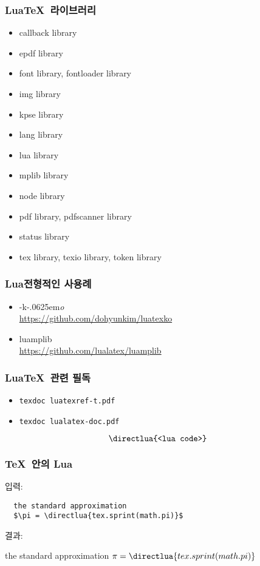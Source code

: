 \documentclass{beamer}
\def\luatex{\hologo{LuaTeX}}
\def\logoko{\textsf{k}\kern-.0625em\textit{o}}
\def\luatexko{\luatex-\logoko}
\begin{document}
\begin{frame}
  \frametitle{Lua\TeX\ 라이브러리}
  \vspace{-3mm}
  \begin{itemize}
  \item callback library
  \item epdf library
  \item font library, fontloader library
  \item img library
  \item kpse library
  \item lang library
  \item lua library
  \item mplib library
  \item node library
  \item pdf library, pdfscanner library
  \item status library
  \item tex library, texio library, token library
  \end{itemize}
\end{frame}

\begin{frame}
  \frametitle{Lua 전형적인 사용례}
  \begin{itemize}
  \item \luatexko\\ \url{https://github.com/dohyunkim/luatexko}
  \item luamplib\\ \url{https://github.com/lualatex/luamplib}
  \end{itemize}
\end{frame}

\begin{frame}[fragile]
  \frametitle{Lua\TeX\ 관련 필독}
  \begin{itemize}
  \item \texttt{texdoc luatexref-t.pdf}
  \item \texttt{texdoc lualatex-doc.pdf}
  \end{itemize}
\end{frame}

\begin{frame}[fragile]
  \[\texttt{\string\directlua\{<lua code>\}}\]
  \frametitle{\TeX\ 안의 Lua}
  입력:
\begin{verbatim}
  the standard approximation 
  $\pi = \directlua{tex.sprint(math.pi)}$
\end{verbatim}
결과:
\begin{center}
  the standard approximation $\pi = \directlua{tex.sprint(math.pi)}$
\end{center}
\end{frame}
\end{document}
